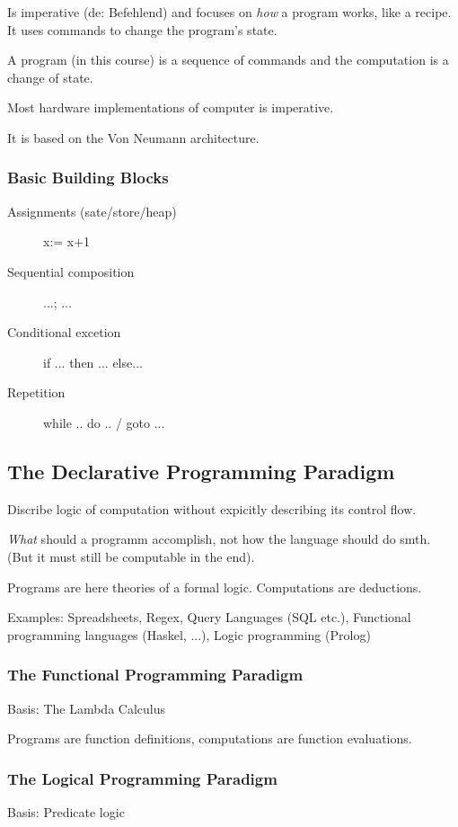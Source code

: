 Is imperative (de: Befehlend) and focuses on \emph{how} a program works, like a recipe. It uses commands to change the program's state.

A program (in this course) is a sequence of commands and the computation is a change of state.

Most hardware implementations of computer is imperative.

It is based on the Von Neumann architecture.

\subsubsection{Basic Building Blocks}

\begin{description}
	\item[Assignments (sate/store/heap)] x:= x+1 %
	\item[Sequential composition] ...; ...
	\item[Conditional excetion] if ... then ... else...
	\item[Repetition] while .. do .. / goto ...
\end{description}



\subsection{The Declarative Programming Paradigm}

Discribe logic of computation without expicitly describing its control flow.

\emph{What} should a programm accomplish, not how the language should do smth. (But it must still be computable in the end).

Programs are here theories of a formal logic. Computations are deductions.

Examples: Spreadsheets, Regex, Query Languages (SQL etc.), Functional programming languages (Haskel, ...), Logic programming (Prolog)

\subsubsection{The Functional Programming Paradigm}

Basis: The Lambda Calculus

Programs are function definitions, computations are function evaluations.

\subsubsection{The Logical Programming Paradigm}
Basis: Predicate logic

